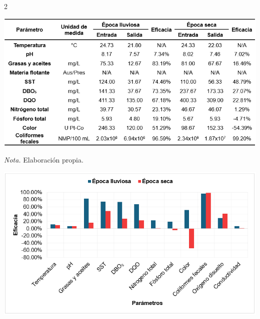 \documentclass[12pt,spanish,Letterpaper,openany]{book}
\begin{document}
\begin {multicols}{2}
\begin {flushleft}
\noindent\begin{minipage}[c]{\columnwidth}

\textbf{}

\begin{center}\includegraphics[width=1\linewidth]{imagenes_articulos/art06_01} \end{center}

\emph{Nota.} Elaboración propia.

\end{minipage}
\end {flushleft}

\begin {flushleft}
\noindent\begin{minipage}[c]{\columnwidth}

\textbf{}

\begin{center}\includegraphics[width=1\linewidth]{imagenes_articulos/art06_02} \end{center}


\end{minipage}
\end{flushleft}
\end{multicols}
\end{document}
